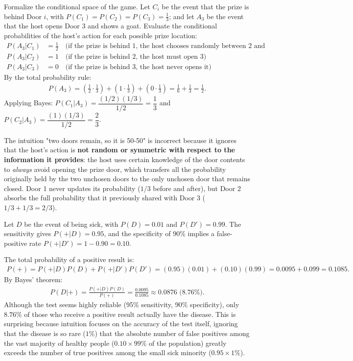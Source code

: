 \begin{solproblema}[prob:c840e8f]
	Formalize the conditional space of the game. Let $C_i$ be the event that the prize is behind Door $i$, with $P(C_1)=P(C_2)=P(C_3)=\frac{1}{3}$; and let $A_3$ be the event that the host opens Door 3 and shows a goat. Evaluate the conditional probabilities of the host's action for each possible prize location:
	\begin{align}
		P(A_3 | C_1) &= \frac{1}{2} \quad \text{(if the prize is behind 1, the host chooses randomly between 2 and 3)} \\
		P(A_3 | C_2) &= 1 \quad \text{(if the prize is behind 2, the host must open 3)} \\
		P(A_3 | C_3) &= 0 \quad \text{(if the prize is behind 3, the host never opens it)}
	\end{align}
	By the total probability rule:
	\begin{align}
		P(A_3) = \left(\frac{1}{2} \cdot \frac{1}{3}\right) + \left(1 \cdot \frac{1}{3}\right) + \left(0 \cdot \frac{1}{3}\right) = \frac{1}{6} + \frac{1}{3} = \frac{1}{2}.
	\end{align}
	Applying Bayes: $P(C_1|A_3) = \dfrac{(1/2)(1/3)}{1/2} = \dfrac{1}{3}$ and $P(C_2|A_3) = \dfrac{(1)(1/3)}{1/2} = \dfrac{2}{3}$.

	The intuition "two doors remain, so it is 50-50" is incorrect because it ignores that the host's action is \textbf{not random or symmetric with respect to the information it provides}: the host uses certain knowledge of the door contents to \emph{always} avoid opening the prize door, which transfers all the probability originally held by the two unchosen doors to the only unchosen door that remains closed. Door 1 never updates its probability ($1/3$ before and after), but Door 2 absorbs the full probability that it previously shared with Door 3 ($1/3+1/3=2/3$).
\end{solproblema}

\begin{solproblema}
	Let $D$ be the event of being sick, with $P(D)=0.01$ and $P(D')=0.99$. The sensitivity gives $P(+|D)=0.95$, and the specificity of $90\%$ implies a false-positive rate $P(+|D')=1-0.90=0.10$.

	The total probability of a positive result is:
	\begin{align}
		P(+) = P(+|D)P(D) + P(+|D')P(D') = (0.95)(0.01) + (0.10)(0.99) = 0.0095 + 0.099 = 0.1085.
	\end{align}
	By Bayes' theorem:
	\begin{align}
		P(D|+) = \frac{P(+|D)P(D)}{P(+)} = \frac{0.0095}{0.1085} \approx 0.0876 \text{ (8.76\%).}
	\end{align}
	Although the test seems highly reliable (95\% sensitivity, 90\% specificity), only $8.76\%$ of those who receive a positive result actually have the disease. This is surprising because intuition focuses on the accuracy of the test itself, ignoring that the disease is so rare ($1\%$) that the absolute number of false positives among the vast majority of healthy people ($0.10 \times 99\%$ of the population) greatly exceeds the number of true positives among the small sick minority ($0.95\times1\%$).
\end{solproblema}
